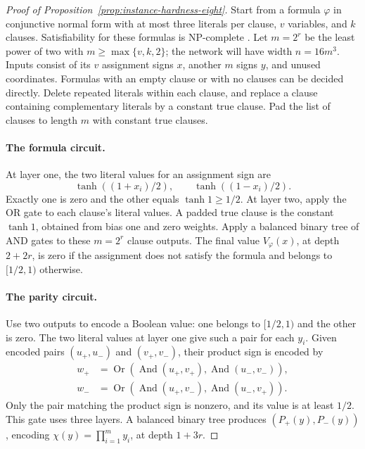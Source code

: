 \begin{proof}[Proof of Proposition~\ref{prop:instance-hardness-eight}]
Start from a formula \(\varphi\) in conjunctive normal form with
at most three literals per clause, \(v\) variables, and \(k\)
clauses.  Satisfiability for these formulas
is NP-complete \cite{cook1971,karp1972}.  Let \(m=2^r\) be the least
power of two with \(m\ge\max\{v,k,2\}\); the network will have width
\(n=16m^3\).  Inputs consist of its
\(v\) assignment signs \(x\), another \(m\) signs \(y\), and
unused coordinates.  Formulas with an empty clause or with no
clauses can be decided directly.  Delete repeated literals within
each clause, and replace a clause containing complementary literals
by a constant true clause.  Pad the list of clauses
to length \(m\) with constant true clauses.

\paragraph{The formula circuit.}
At layer one, the two literal values for an assignment sign are
\[
 \tanh((1+x_i)/2),\qquad\tanh((1-x_i)/2).
\]
Exactly one is zero and the other equals \(\tanh1\ge1/2\).
At layer two, apply the OR gate to each clause's literal values.
A padded true clause is the constant \(\tanh1\), obtained from
bias one and zero weights.  Apply a balanced binary tree of AND
gates to these \(m=2^r\) clause outputs.  The final value
\(V_\varphi(x)\), at depth \(2+2r\), is zero if the assignment
does not satisfy the formula and belongs to \([1/2,1)\) otherwise.

\paragraph{The parity circuit.}
Use two outputs to encode a Boolean value: one belongs to
\([1/2,1)\) and the other is zero.  The two literal values at
layer one give such a pair for each \(y_i\).  Given encoded pairs
\((u_+,u_-)\) and \((v_+,v_-)\), their product sign is encoded by
\begin{align*}
 w_+&=\operatorname{Or}
       (\operatorname{And}(u_+,v_+),
        \operatorname{And}(u_-,v_-)),\\
 w_-&=\operatorname{Or}
       (\operatorname{And}(u_+,v_-),
        \operatorname{And}(u_-,v_+)).
\end{align*}
Only the pair matching the product sign is nonzero, and its value
is at least \(1/2\).  This gate uses three layers.  A balanced
binary tree produces \((P_+(y),P_-(y))\), encoding
\(\chi(y)=\prod_{i=1}^m y_i\), at depth \(1+3r\).


\end{proof}
